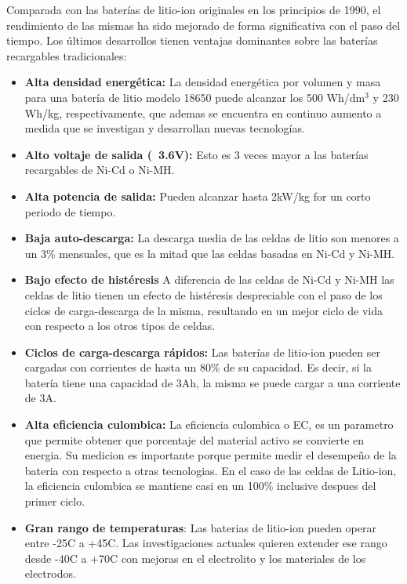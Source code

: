 \documentclass[10pt,a4paper]{article}
\begin{document}
    Comparada con las baterías de litio-ion originales en los principios de
    1990, el rendimiento de las mismas ha sido mejorado de forma significativa
    con el paso del tiempo. Los últimos desarrollos tienen ventajas dominantes
    sobre las baterías recargables tradicionales:
	\begin{itemize}
        \item \textbf{Alta densidad energética:} La densidad energética por
            volumen y masa para una batería de litio modelo 18650 puede alcanzar
            los 500 Wh/$\mathrm{dm^3}$ y 230 Wh/kg, respectivamente, que ademas
            se encuentra en continuo aumento a medida que se investigan y
            desarrollan nuevas tecnologías.
        \item \textbf{Alto voltaje de salida (~3.6V):} Esto es 3 veces mayor a
            las baterías recargables de Ni-Cd o Ni-MH.
        \item \textbf{Alta potencia de salida:} Pueden alcanzar hasta 2kW/kg for
            un corto periodo de tiempo.
        \item \textbf{Baja auto-descarga:} La descarga media de las celdas de
            litio son menores a un 3\% mensuales, que es la mitad que las celdas
            basadas en Ni-Cd y Ni-MH.
        \item \textbf{Bajo efecto de histéresis} A diferencia de las celdas de
            Ni-Cd y Ni-MH las celdas de litio tienen un efecto de histéresis
            despreciable con el paso de los ciclos de carga-descarga de la
            misma, resultando en un mejor ciclo de vida con respecto a los otros
            tipos de celdas.
        \item \textbf{Ciclos de carga-descarga rápidos:} Las baterías de
            litio-ion pueden ser cargadas con corrientes de hasta un 80\% de su
            capacidad. Es decir, si la batería tiene una capacidad de 3Ah, la
            misma se puede cargar a una corriente de 3A.
        \item \textbf{Alta eficiencia culombica:} La eficiencia culombica o EC,
            es un parametro que permite obtener que porcentaje del material
            activo se convierte en energia. Su medicion es importante porque 
            permite medir el desempeño de la bateria con respecto a otras 
            tecnologias. En el caso de las celdas de Litio-ion, la eficiencia 
            culombica se mantiene casi en un 100\% inclusive despues del primer
            ciclo.
        \item \textbf{Gran rango de temperaturas}: Las baterias de litio-ion
            pueden operar entre -25\degree C a +45\degree C. Las
            investigaciones actuales quieren extender ese rango desde
            -40\degree C a +70\degree C con mejoras en el
            electrolito y los materiales de los electrodos.
		

\end{itemize}
\end{document}
